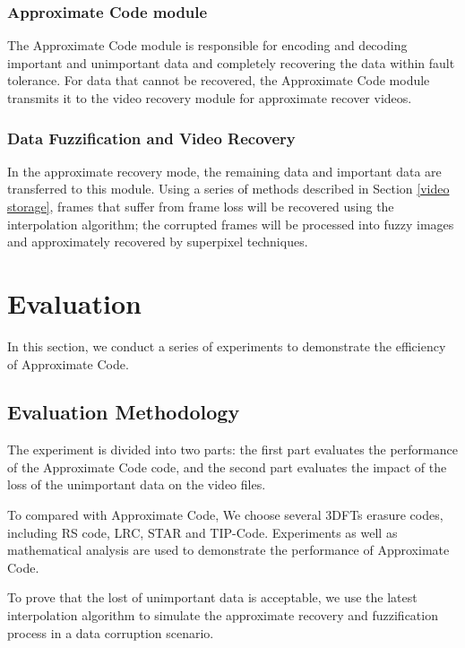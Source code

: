 \documentclass[sigconf]{acmart}
\begin{document}
\subsubsection{Approximate Code module}
The Approximate Code module is responsible for encoding and decoding important and unimportant data and completely recovering the data within fault tolerance. For data that cannot be recovered, the Approximate Code module transmits it to the video recovery module for approximate recover videos.

\subsubsection{Data Fuzzification and Video Recovery}
In the approximate recovery mode, the remaining data and important data are transferred to this module. Using a series of methods described in Section \ref{video storage}, frames that suffer from frame loss will be recovered using the interpolation algorithm; the corrupted frames will be processed into fuzzy images and approximately recovered by superpixel techniques.


\section{Evaluation}\label{evaluation}
In this section, we conduct a series of experiments to demonstrate the efficiency of Approximate Code.
\subsection{Evaluation Methodology}
The experiment is divided into two parts: the first part evaluates the performance of the Approximate Code code, and the second part evaluates the impact of the loss of the unimportant data on the video files.

To compared with Approximate Code, We choose several 3DFTs erasure codes, including RS code, LRC, STAR and TIP-Code.
Experiments as well as mathematical analysis are used to demonstrate the performance of Approximate Code.

To prove that the lost of unimportant data is acceptable, we use the latest interpolation algorithm to simulate the approximate recovery and fuzzification process in a data corruption scenario.
\end{document}
